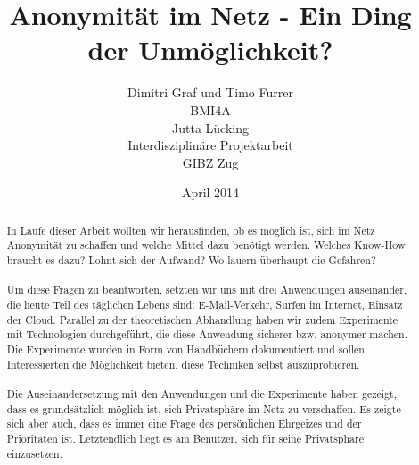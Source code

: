 \documentclass[12pt,titlepage]{article}
\begin{document}
\title{Anonymität im Netz - Ein Ding der Unmöglichkeit?}
\author{Dimitri Graf und Timo Furrer\\
  BMI4A\\
  Jutta Lücking\\
  Interdisziplinäre Projektarbeit\\
  GIBZ Zug}
\date{April 2014}
\maketitle

\tableofcontents
\newpage

\begin{abstract}
In Laufe dieser Arbeit wollten wir herausfinden, ob es möglich ist, sich im Netz Anonymität zu schaffen und welche Mittel dazu benötigt werden. Welches Know-How braucht es dazu? Lohnt sich der Aufwand? Wo lauern überhaupt die Gefahren?
\\
\\
Um diese Fragen zu beantworten, setzten wir uns mit drei Anwendungen auseinander, die heute Teil des täglichen Lebens sind: E-Mail-Verkehr, Surfen im Internet, Einsatz der Cloud. Parallel zu der theoretischen Abhandlung haben wir zudem Experimente mit Technologien durchgeführt, die diese Anwendung sicherer bzw. anonymer machen. Die Experimente wurden in Form von Handbüchern dokumentiert und sollen Interessierten die Möglichkeit bieten, diese Techniken selbst auszuprobieren.
\\
\\
Die Auseinandersetzung mit den Anwendungen und die Experimente haben gezeigt, dass es grundsätzlich möglich ist, sich Privatsphäre im Netz zu verschaffen. Es zeigte sich aber auch, dass es immer eine Frage des persönlichen Ehrgeizes und der Prioritäten ist. Letztendlich liegt es am Benutzer, sich für seine Privatsphäre einzusetzen.

\end{abstract}



\listoffigures
\end{document}
